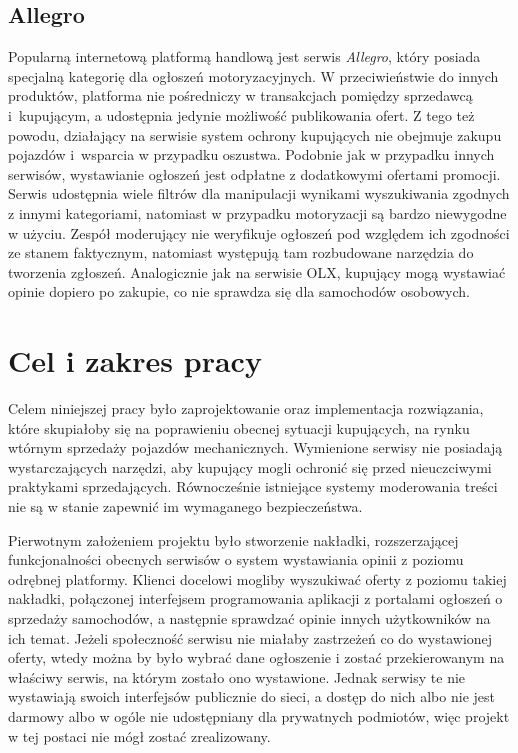 \subsection{Allegro}

Popularną internetową platformą handlową jest serwis \emph{Allegro}, który posiada specjalną kategorię dla ogłoszeń motoryzacyjnych.
W przeciwieństwie do innych produktów, platforma nie pośredniczy w transakcjach pomiędzy sprzedawcą i~kupującym, a udostępnia jedynie możliwość publikowania ofert.
Z tego też powodu, działający na serwisie system ochrony kupujących nie obejmuje zakupu pojazdów i~wsparcia w przypadku oszustwa.
Podobnie jak w przypadku innych serwisów, wystawianie ogłoszeń jest odpłatne z dodatkowymi ofertami promocji.
Serwis udostępnia wiele filtrów dla manipulacji wynikami wyszukiwania zgodnych z innymi kategoriami, natomiast w przypadku motoryzacji są bardzo niewygodne w użyciu.
Zespół moderujący nie weryfikuje ogłoszeń pod względem ich zgodności ze stanem faktycznym, natomiast występują tam rozbudowane narzędzia do tworzenia zgłoszeń.
Analogicznie jak na serwisie OLX, kupujący mogą wystawiać opinie dopiero po zakupie, co nie sprawdza się dla samochodów osobowych.

\section{Cel i zakres pracy}

Celem niniejszej pracy było zaprojektowanie oraz implementacja rozwiązania, które skupiałoby się na poprawieniu obecnej sytuacji kupujących, na rynku wtórnym sprzedaży pojazdów mechanicznych.
Wymienione serwisy nie posiadają wystarczających narzędzi, aby kupujący mogli ochronić się przed nieuczciwymi praktykami sprzedających.
Równocześnie istniejące systemy moderowania treści nie są w stanie zapewnić im wymaganego bezpieczeństwa.

Pierwotnym założeniem projektu było stworzenie nakładki, rozszerzającej funkcjonalności obecnych serwisów o system wystawiania opinii z poziomu odrębnej platformy.
Klienci docelowi mogliby wyszukiwać oferty z poziomu takiej nakładki, połączonej interfejsem programowania aplikacji z portalami ogłoszeń o sprzedaży samochodów, a następnie sprawdzać opinie innych użytkowników na ich temat.
Jeżeli społeczność serwisu nie miałaby zastrzeżeń co do wystawionej oferty, wtedy można by było wybrać dane ogłoszenie i zostać przekierowanym na właściwy serwis, na którym zostało ono wystawione.
Jednak serwisy te nie wystawiają swoich interfejsów publicznie do sieci, a dostęp do nich albo nie jest darmowy albo w ogóle nie udostępniany dla prywatnych podmiotów, więc projekt w tej postaci nie mógł zostać zrealizowany.

